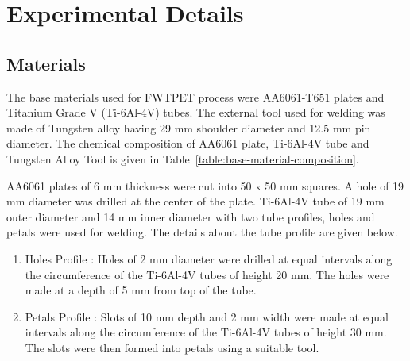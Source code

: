 \documentclass[3p]{elsarticle}
\begin{document}


\begin{table}[!t]

\end{table}


\section{Experimental Details} 
\label{sec:Experimental Details}
\subsection{Materials}
\label{subsec:Materials}
The base materials used for FWTPET process were AA6061-T651 plates and Titanium Grade V (Ti-6Al-4V) tubes. The external tool used for welding was made of Tungsten alloy having 29 mm shoulder diameter and 12.5 mm pin diameter. The chemical composition of AA6061 plate, Ti-6Al-4V tube and Tungsten Alloy Tool is given in Table~\ref{table:base-material-composition}.
\par 
AA6061 plates of 6 mm thickness were cut into 50 x 50 mm squares. A hole of 19 mm diameter was drilled at the center of the plate. Ti-6Al-4V tube of 19 mm outer diameter and 14 mm inner diameter with two tube profiles, holes and petals were used for welding. The details about the tube profile are given below.
\begin{enumerate}[1.]
\item Holes Profile : Holes of 2 mm diameter were drilled at equal intervals along the circumference of the Ti-6Al-4V tubes of height 20 mm. The holes were made at a depth of 5 mm from top of the tube.
\item Petals Profile : Slots of 10 mm depth and 2 mm width were made at equal intervals along the circumference of the Ti-6Al-4V tubes of height 30 mm. The slots were then formed into petals using a suitable tool.
\end{enumerate}
\end{document}
